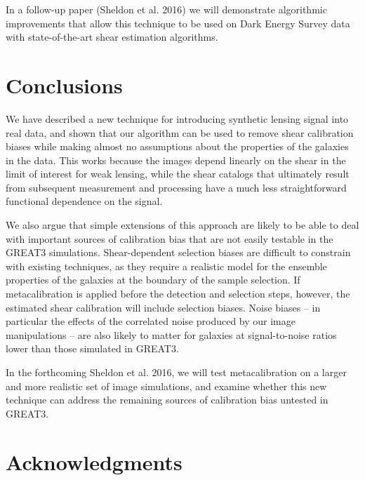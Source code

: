 \documentclass[iop]{emulateapj}
\begin{document}
In a follow-up paper (Sheldon et al. 2016) we will demonstrate
algorithmic improvements that allow this technique to be used on Dark
Energy Survey data with state-of-the-art shear estimation algorithms.

\section{Conclusions}
We have described a new technique for introducing synthetic lensing
signal into real data, and shown that our algorithm can be used to
remove shear calibration biases while making almost no assumptions
about the properties of the galaxies in the data. This works because
the images depend linearly on the shear in the limit of interest for
weak lensing, while the shear catalogs that ultimately result from
subsequent measurement and processing have a much less straightforward
functional dependence on the signal.

We also argue that simple extensions of this approach are likely to be
able to deal with important sources of calibration bias that are not
easily testable in the GREAT3 simulations. Shear-dependent selection
biases are difficult to constrain with existing techniques, as they
require a realistic model for the ensemble properties of the galaxies
at the boundary of the sample selection. If metacalibration is applied
before the detection and selection steps, however, the estimated shear
calibration will include selection biases. Noise biases -- in
particular the effects of the correlated noise produced by our image
manipulations -- are also likely to matter for galaxies at
signal-to-noise ratios lower than those simulated in GREAT3.

In the forthcoming Sheldon et al. 2016, we will test metacalibration
on a larger and more realistic set of image simulations, and examine
whether this new technique can address the remaining sources of
calibration bias untested in GREAT3.




\section*{Acknowledgments}




\end{document}
